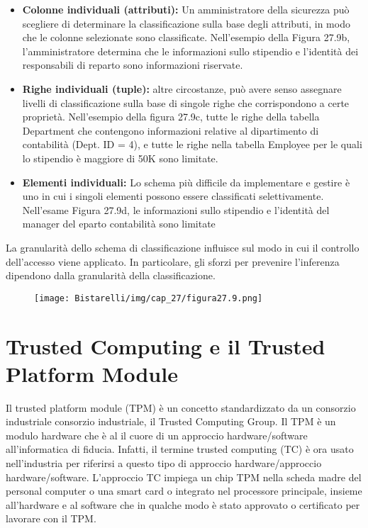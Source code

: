 \begin{itemize}
    \item \textbf{Colonne individuali (attributi):} Un amministratore della sicurezza può scegliere di determinare la classificazione sulla base degli attributi, in modo che le colonne selezionate sono classificate. Nell'esempio della Figura 27.9b, l'amministratore determina che le informazioni sullo stipendio e l'identità dei responsabili di reparto sono informazioni riservate.
    
    \item \textbf{Righe individuali (tuple):} altre circostanze, può avere senso assegnare livelli di classificazione sulla base di singole righe che corrispondono a certe proprietà. Nell'esempio della figura 27.9c, tutte le righe della tabella Department che contengono informazioni relative al dipartimento di contabilità (Dept. ID = 4), e tutte le righe nella tabella Employee per le quali lo stipendio è maggiore di 50K sono limitate.
    
    \item \textbf{Elementi individuali:} Lo schema più difficile da implementare e gestire è uno in cui i singoli elementi possono essere classificati selettivamente. Nell'esame Figura 27.9d, le informazioni sullo stipendio e l'identità del manager del eparto contabilità sono limitate
\end{itemize}

La granularità dello schema di classificazione influisce sul modo in cui il controllo dell'accesso viene applicato. In particolare, gli sforzi per prevenire l'inferenza dipendono dalla granularità della classificazione.

\begin{figure}[H]
	\centering
    \texttt{[image: Bistarelli/img/cap\_27/figura27.9.png]}
\end{figure}


\section{Trusted Computing e il Trusted Platform Module}

Il trusted platform module (TPM) è un concetto standardizzato da un consorzio industriale consorzio industriale, il Trusted Computing Group. Il TPM è un modulo hardware che è al il cuore di un approccio hardware/software all'informatica di fiducia. Infatti, il termine trusted computing (TC) è ora usato nell'industria per riferirsi a questo tipo di approccio hardware/approccio hardware/software. L'approccio TC impiega un chip TPM nella scheda madre del personal computer o una smart card o integrato nel processore principale, insieme all'hardware e al software che in qualche modo è stato approvato o certificato per lavorare con il TPM.

